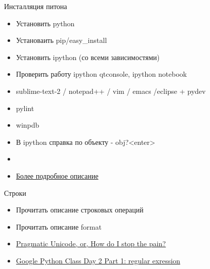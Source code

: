\documentclass{article}
\begin{document}
\LARGE

\begin{center} Инсталляция питона \end{center}
\begin{itemize}
    \item Установить python
    \item Установаить pip/easy\_install
    \item Установить ipython (со всеми зависимостями)
    \item Проверить работу ipython qtconsole, ipython notebook
    \item sublime-text-2 / notepad++ / vim / emacs /eclipse + pydev
    \item pylint
    \item winpdb
    \item В ipython справка по объекту - obj?<enter>
    \item
    \item \href{http://koder-ua.blogspot.com/2012/09/blog-post.html}{Более подробное описание}
\end{itemize}
\newpage

\begin{center} Строки \end{center}
\begin{itemize}
    \item Прочитать описание строковых операций
    \item Прочитать описание format
    \item \href{http://www.youtube.com/watch?feature=player_embedded&v=sgHbC6udIqc}{Pragmatic Unicode, or, How do I stop the pain?}
    \item \href{http://www.youtube.com/watch?v=kWyoYtvJpe4}{Google Python Class Day 2 Part 1: regular exression}
\end{itemize}
\newpage
\end{document}
